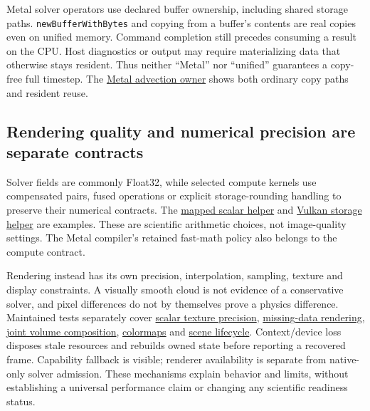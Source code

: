\documentclass[
  11pt,
]{article}
\begin{document}
Metal solver operators use declared buffer ownership, including shared
storage paths. \texttt{newBufferWithBytes} and copying from a buffer's
contents are real copies even on unified memory. Command completion
still precedes consuming a result on the CPU. Host diagnostics or output
may require materializing data that otherwise stays resident. Thus
neither ``Metal'' nor ``unified'' guarantees a copy-free full timestep.
The \href{../metal/src/compute/backend/advection.inc}{Metal advection
owner} shows both ordinary copy paths and resident reuse.

\subsection{Rendering quality and numerical precision are separate
contracts}\label{rendering-quality-and-numerical-precision-are-separate-contracts}

Solver fields are commonly Float32, while selected compute kernels use
compensated pairs, fused operations or explicit storage-rounding
handling to preserve their numerical contracts. The
\href{../metal/include/compute/metal/shaders/terrain/mapped_scalar_math_msl.hpp}{mapped
scalar helper} and
\href{../vulkan/shaders/compute/terrain/compensated_storage.glsl}{Vulkan
storage helper} are examples. These are scientific arithmetic choices,
not image-quality settings. The Metal compiler's retained fast-math
policy also belongs to the compute contract.

Rendering instead has its own precision, interpolation, sampling,
texture and display constraints. A visually smooth cloud is not evidence
of a conservative solver, and pixel differences do not by themselves
prove a physics difference. Maintained tests separately cover
\href{../tests/ui/unit/vtk/test_volume_scalar_sampling.ts}{scalar texture
precision},
\href{../tests/ui/browser/specs/volume-validity.spec.ts}{missing-data
rendering}, \href{../tests/ui/browser/specs/joint-volume.spec.ts}{joint
volume composition},
\href{../tests/ui/browser/specs/volume-colormap.spec.ts}{colormaps} and
\href{../tests/ui/browser/specs/vtk-lifecycle.spec.ts}{scene lifecycle}.
Context/device loss disposes stale resources and rebuilds owned state
before reporting a recovered frame. Capability fallback is visible;
renderer availability is separate from native-only solver admission.
These mechanisms explain behavior and limits, without establishing a
universal performance claim or changing any scientific readiness status.



\end{document}
